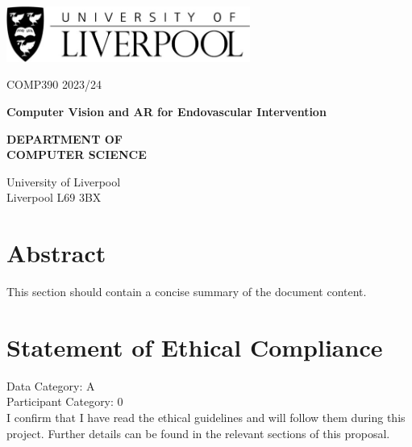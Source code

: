 \documentclass[12pt]{article}
\begin{document}
\newpage
\begin{titlepage}
      \centering


      \includegraphics[width=0.6\textwidth]{Liverpool.jpg} %
      \vspace*{1cm}

      \Large
      COMP390
      \large
      2023/24

      \vspace{4.5cm}
      \Huge
      \textbf{Computer Vision and AR for Endovascular Intervention}

      \vspace{1.5cm}



      \vspace{4cm} %
      \Large
      \textbf{DEPARTMENT OF}\\
      \vspace{0.1cm} %
      \textbf{COMPUTER SCIENCE}

      \vspace{1cm} %
      \large
      University of Liverpool\\
      Liverpool L69 3BX

\end{titlepage}
\tableofcontents
\newpage

\section*{Abstract}
This section should contain a concise summary of the document content.
\section*{Statement of Ethical Compliance}
\begin{mdframed}
      \Large %
      Data Category: A \\
      Participant Category: 0 \\
      \normalsize %
      I confirm that I have read the ethical guidelines and will follow them during this project. Further details can be found in the relevant sections of this proposal.
\end{mdframed}
\newpage
\end{document}
